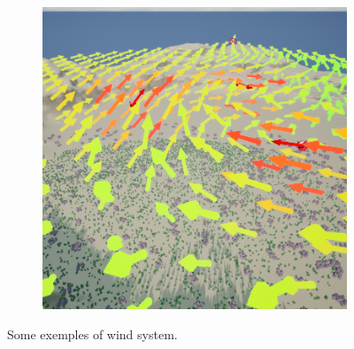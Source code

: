 \documentclass[../main.tex]{subfile}
\begin{document}
\begin{figure}[H]
\begin{subfigure}{.5\textwidth}
    \end{subfigure}
    \begin{subfigure}{.5\textwidth}
        \centering
        \includegraphics[width=.9\textwidth]{Ressources/Map3D.png}
    \end{subfigure}%
    \caption{Some exemples of wind system.}
\end{figure}
\end{document}
